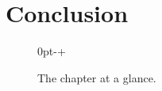 \clearpage %
\section*{Conclusion}

\begin{figure}[!htb]
  \begin{adjustwidth}{0pt}{-\dimexpr\marginparwidth+\marginparsep\relax}
  \centering
  \resizebox{\linewidth}{!}{}
  \caption{The chapter at a glance.}
  \label{fig:map}
  \end{adjustwidth}
\end{figure}
